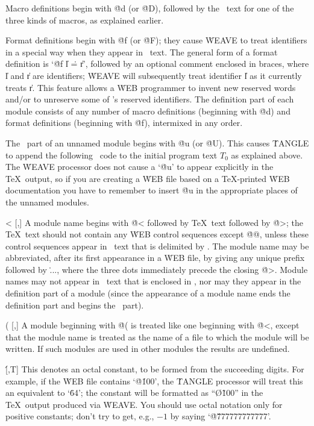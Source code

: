 \@d [\oP,\oT] Macro definitions begin with \.{@d} (or \.{@D}), followed by
the \PASCAL\ text for one of the three kinds of macros, as explained
earlier.

\@f [\oP,\oT] Format definitions begin with \.{@f} (or \.{@F}); they cause
\.{WEAVE} to treat identifiers in a special way when they appear in
\PASCAL\ text.
The general form of a format definition is `\.{@f} \|l \.{=}
\|r', followed by an optional comment enclosed in braces, where \|l and \|r
are identifiers; \.{WEAVE} will subsequently treat identifier \|l as it
currently treats \|r.
This feature allows a \.{WEB} programmer to invent
new reserved words and/or to unreserve some of \PASCAL's reserved
identifiers.
The definition part of each module consists of any number of
macro definitions (beginning with \.{@d}) and format definitions (beginning
with \.{@f}), intermixed in any order.


\@u [\oP,\oT] \newstuff
The \PASCAL\ part of an unnamed module begins with \.{@u}
(or \.{@U}).
\endnewstuff
This causes \.{TANGLE} to append the following \PASCAL\ code
to the initial program text $T_0$ as explained above.
The \.{WEAVE}
processor does not cause a `\.{@u}' to appear explicitly in the \TeX\
output, so if you are creating a \.{WEB} file based on a \TeX-printed
\.{WEB} documentation you have to remember to insert \.{@u} in the
appropriate places of the unnamed modules.

\@< [\PAS,\oT] A module name begins with \.{@<} followed by \TeX\ text followed
by \.{@>}; the \TeX\ text should not contain any \.{WEB} control sequences
except \.{@@}, unless these control sequences appear in \PASCAL\ text that
is delimited by \pb.
The module name may be abbreviated, after its first
appearance in a \.{WEB} file, by giving any unique prefix followed by \.{...},
where the three dots immediately precede the closing \.{@>}.
Module names may
not appear in \PASCAL\ text that is enclosed in \pb, nor may they appear
in the definition part of a module (since the appearance of a module name
ends the definition part and begins the \PASCAL\ part).


\@( [\PAS,\oT] \newstuff A module beginning
with \.{@(} is treated like one beginning with \.{@<},
except that the module name is treated as the name of a file to which
the module will be written.
If such modules are used in other modules the results are undefined.
\endnewstuff

\@\' [\PAS,T] This denotes an octal constant, to be formed from the
succeeding digits.
For example, if the \.{WEB} file contains `\.{@\'100}',
the \.{TANGLE} processor will treat this an equivalent to `\.{64}';
the constant will be formatted as ``\O{\~100}'' in the \TeX\ output
produced via \.{WEAVE}.
You should use octal notation only for positive
constants; don't try to get, e.g., $-1$ by saying `\.{@\'777777777777}'.

